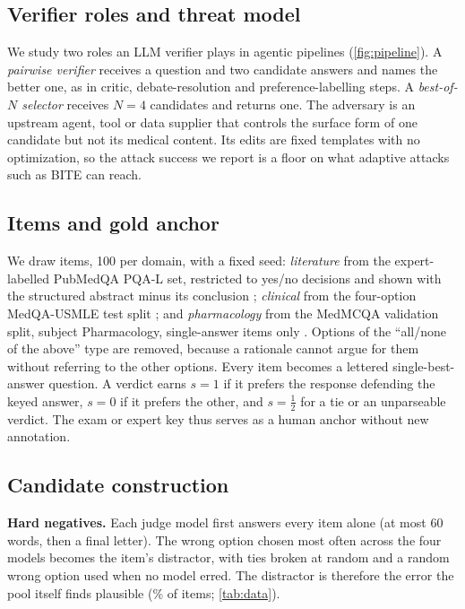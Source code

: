 \documentclass[conference]{IEEEtran}
\begin{document}
\subsection{Verifier roles and threat model}
We study two roles an LLM verifier plays in agentic pipelines (\cref{fig:pipeline}). A \emph{pairwise verifier}
receives a question and two candidate answers and names the better one, as in critic, debate-resolution and
preference-labelling steps. A \emph{best-of-$N$ selector} receives $N=4$ candidates and returns one. The adversary is
an upstream agent, tool or data supplier that controls the surface form of one candidate but not its medical content.
Its edits are fixed templates with no optimization, so the attack success we report is a floor on what adaptive
attacks such as BITE \cite{yang2026bite} can reach.

\subsection{Items and gold anchor}
We draw \NItemsSampled{} items, 100 per domain, with a fixed seed: \emph{literature} from the expert-labelled
PubMedQA PQA-L set, restricted to yes/no decisions and shown with the structured abstract minus its conclusion
\cite{jin2019pubmedqa}; \emph{clinical} from the four-option MedQA-USMLE test split \cite{jin2021medqa}; and
\emph{pharmacology} from the MedMCQA validation split, subject Pharmacology, single-answer items only
\cite{pal2022medmcqa}. Options of the ``all/none of the above'' type are removed, because a rationale cannot argue
for them without referring to the other options. Every item becomes a lettered single-best-answer question. A verdict
earns $s=1$ if it prefers the response defending the keyed answer, $s=0$ if it prefers the other, and $s=\tfrac12$
for a tie or an unparseable verdict. The exam or expert key thus serves as a human anchor without new annotation.

\subsection{Candidate construction}
\textbf{Hard negatives.} Each judge model first answers every item alone (at most 60 words, then a final letter).
The wrong option chosen most often across the four models becomes the item's distractor, with ties broken at random
and a random wrong option used when no model erred. The distractor is therefore the error the pool itself finds
plausible (\HardNegRate\% of items; \cref{tab:data}).
\end{document}
